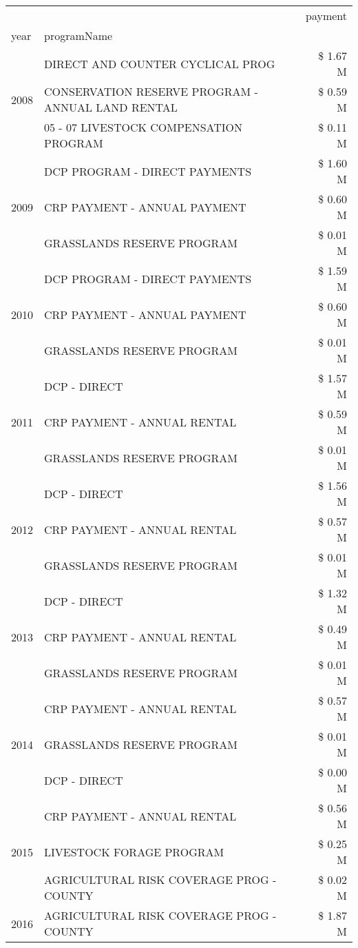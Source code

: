 \begin{tabular}{llr}
\toprule
 &  & payment \\
year & programName &  \\
\midrule
\multirow[t]{3}{*}{2008} & DIRECT AND COUNTER CYCLICAL PROG & \$ 1.67 M \\
 & CONSERVATION RESERVE PROGRAM - ANNUAL LAND RENTAL & \$ 0.59 M \\
 & 05 - 07 LIVESTOCK COMPENSATION PROGRAM & \$ 0.11 M \\
\cline{1-3}
\multirow[t]{3}{*}{2009} & DCP PROGRAM - DIRECT PAYMENTS & \$ 1.60 M \\
 & CRP PAYMENT - ANNUAL PAYMENT & \$ 0.60 M \\
 & GRASSLANDS RESERVE PROGRAM & \$ 0.01 M \\
\cline{1-3}
\multirow[t]{3}{*}{2010} & DCP PROGRAM - DIRECT PAYMENTS & \$ 1.59 M \\
 & CRP PAYMENT - ANNUAL PAYMENT & \$ 0.60 M \\
 & GRASSLANDS RESERVE PROGRAM & \$ 0.01 M \\
\cline{1-3}
\multirow[t]{3}{*}{2011} & DCP - DIRECT & \$ 1.57 M \\
 & CRP PAYMENT - ANNUAL RENTAL & \$ 0.59 M \\
 & GRASSLANDS RESERVE PROGRAM & \$ 0.01 M \\
\cline{1-3}
\multirow[t]{3}{*}{2012} & DCP - DIRECT & \$ 1.56 M \\
 & CRP PAYMENT - ANNUAL RENTAL & \$ 0.57 M \\
 & GRASSLANDS RESERVE PROGRAM & \$ 0.01 M \\
\cline{1-3}
\multirow[t]{3}{*}{2013} & DCP - DIRECT & \$ 1.32 M \\
 & CRP PAYMENT - ANNUAL RENTAL & \$ 0.49 M \\
 & GRASSLANDS RESERVE PROGRAM & \$ 0.01 M \\
\cline{1-3}
\multirow[t]{3}{*}{2014} & CRP PAYMENT - ANNUAL RENTAL & \$ 0.57 M \\
 & GRASSLANDS RESERVE PROGRAM & \$ 0.01 M \\
 & DCP - DIRECT & \$ 0.00 M \\
\cline{1-3}
\multirow[t]{3}{*}{2015} & CRP PAYMENT - ANNUAL RENTAL & \$ 0.56 M \\
 & LIVESTOCK FORAGE PROGRAM & \$ 0.25 M \\
 & AGRICULTURAL RISK COVERAGE PROG - COUNTY & \$ 0.02 M \\
\cline{1-3}
\multirow[t]{3}{*}{2016} & AGRICULTURAL RISK COVERAGE PROG - COUNTY & \$ 1.87 M \\

\end{tabular}
